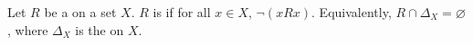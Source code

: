 \begin{definition} \label{definition:irreflexive_binary_relation_on_a_set}
Let $R$ be a  on a set $X$. $R$ is  if for all $x \in X$, $\lnot (x R x)$. Equivalently, $R \cap \Delta_X = \varnothing$, where $\Delta_X$ is the  on $X$.
\end{definition}